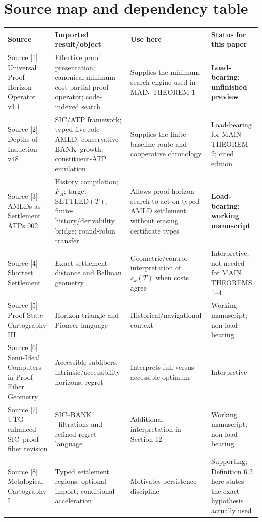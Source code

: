 \documentclass[11pt]{article}
\theoremstyle{definition}
\newcommand{\BANK}{\ensuremath{\mathrm{BANK}}}
\newcommand{\SETTLED}{\ensuremath{\mathrm{SETTLED}}}
\begin{document}
\section{Source map and dependency table}
\begingroup
\footnotesize
\setlength{\tabcolsep}{3pt}
\begin{longtable}{@{}p{}p{}p{}p{}@{}}
\toprule
\textbf{Source} & \textbf{Imported result/object} & \textbf{Use here} & \textbf{Status for this paper}\\
\midrule
\endhead
Source [1] Universal Proof-Horizon Operator v1.1 & Effective proof presentation; canonical minimum-cost partial proof operator; code-indexed search & Supplies the minimum-search engine used in MAIN THEOREM 1 & \textbf{Load-bearing; unfinished preview}\\
\addlinespace
Source [2] Depths of Induction v48 & SIC/ATP framework; typed five-role AMLD; conservative \BANK\ growth; constituent-ATP emulation & Supplies the finite baseline route and cooperative chronology & Load-bearing for MAIN THEOREM 2; cited edition\\
\addlinespace
Source [3] AMLDs as Settlement ATPs 002 & History compilation; $F_A$; target $\SETTLED(T)$; finite-history/derivability bridge; round-robin transfer & Allows proof-horizon search to act on typed AMLD settlement without erasing certificate types & \textbf{Load-bearing; working manuscript}\\
\addlinespace
Source [4] Shortest Settlement & Exact settlement distance and Bellman geometry & Geometric/control interpretation of $s_k(T)$ when costs agree & Interpretive, not needed for MAIN THEOREMS 1--4\\
\addlinespace
Source [5] Proof-State Cartography III & Horizon triangle and Pioneer language & Historical/navigational context & Working manuscript; non-load-bearing\\
\addlinespace
Source [6] Semi-Ideal Computers in Proof-Fiber Geometry & Accessible subfibers, intrinsic/accessibility horizons, regret & Interprets full versus accessible optimum & Interpretive\\
\addlinespace
Source [7] UTG-enhanced SIC--proof-fiber revision & SIC--\BANK\ filtrations and refined regret language & Additional interpretation in Section 12 & Working manuscript; non-load-bearing\\
\addlinespace
Source [8] Metalogical Cartography I & Typed settlement regions; optional import; conditional acceleration & Motivates persistence discipline & Supporting; Definition 6.2 here states the exact hypothesis actually used\\
\bottomrule
\end{longtable}
\endgroup
\end{document}
